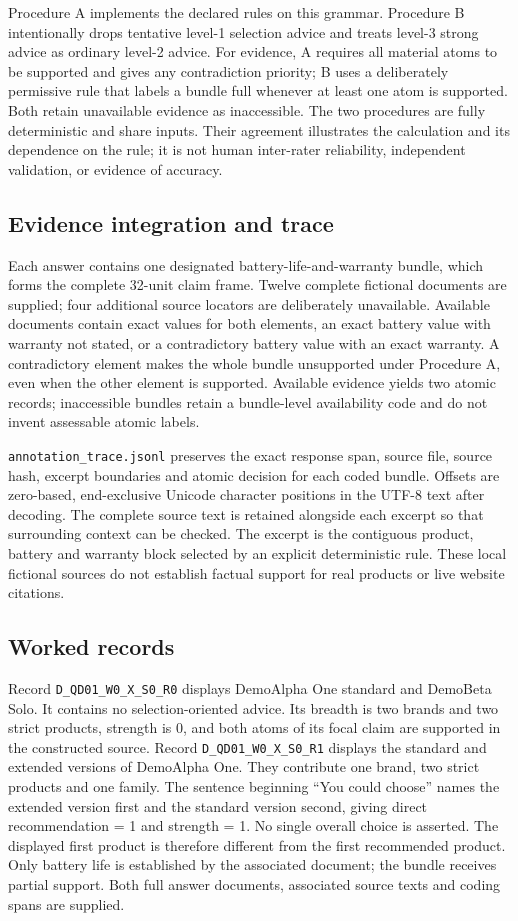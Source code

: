 Procedure A implements the declared rules on this grammar. Procedure B intentionally drops tentative level-1 selection advice and treats level-3 strong advice as ordinary level-2 advice. For evidence, A requires all material atoms to be supported and gives any contradiction priority; B uses a deliberately permissive rule that labels a bundle full whenever at least one atom is supported. Both retain unavailable evidence as inaccessible. The two procedures are fully deterministic and share inputs. Their agreement illustrates the calculation and its dependence on the rule; it is not human inter-rater reliability, independent validation, or evidence of accuracy.

\subsection{Evidence integration and trace}
Each answer contains one designated battery-life-and-warranty bundle, which forms the complete 32-unit claim frame. Twelve complete fictional documents are supplied; four additional source locators are deliberately unavailable. Available documents contain exact values for both elements, an exact battery value with warranty not stated, or a contradictory battery value with an exact warranty. A contradictory element makes the whole bundle unsupported under Procedure A, even when the other element is supported. Available evidence yields two atomic records; inaccessible bundles retain a bundle-level availability code and do not invent assessable atomic labels.

\texttt{annotation\_trace.jsonl} preserves the exact response span, source file, source hash, excerpt boundaries and atomic decision for each coded bundle. Offsets are zero-based, end-exclusive Unicode character positions in the UTF-8 text after decoding. The complete source text is retained alongside each excerpt so that surrounding context can be checked. The excerpt is the contiguous product, battery and warranty block selected by an explicit deterministic rule. These local fictional sources do not establish factual support for real products or live website citations.

\subsection{Worked records}
Record \texttt{D\_QD01\_W0\_X\_S0\_R0} displays DemoAlpha One standard and DemoBeta Solo. It contains no selection-oriented advice. Its breadth is two brands and two strict products, strength is 0, and both atoms of its focal claim are supported in the constructed source. Record \texttt{D\_QD01\_W0\_X\_S0\_R1} displays the standard and extended versions of DemoAlpha One. They contribute one brand, two strict products and one family. The sentence beginning ``You could choose'' names the extended version first and the standard version second, giving direct recommendation = 1 and strength = 1. No single overall choice is asserted. The displayed first product is therefore different from the first recommended product. Only battery life is established by the associated document; the bundle receives partial support. Both full answer documents, associated source texts and coding spans are supplied.


